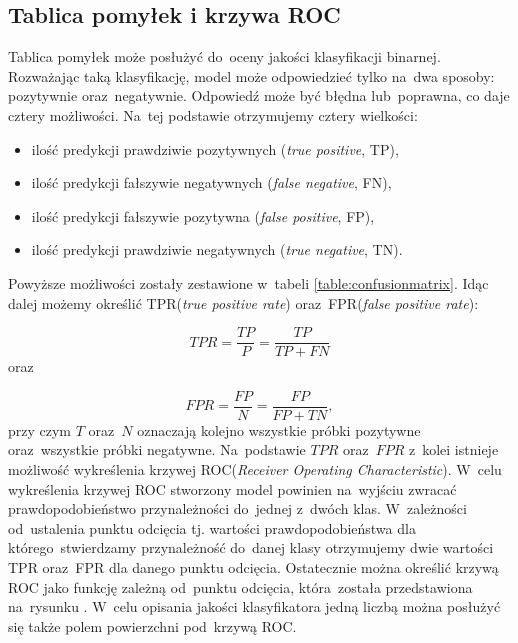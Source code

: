 \subsection{Tablica pomyłek i krzywa ROC}
Tablica pomyłek może posłużyć do~oceny jakości klasyfikacji binarnej. Rozważając taką klasyfikację, model może odpowiedzieć tylko na~dwa sposoby: pozytywnie oraz~negatywnie. Odpowiedź może być błędna lub~poprawna, co daje cztery możliwości. Na~tej podstawie otrzymujemy cztery wielkości:
\begin{itemize}
\item ilość predykcji prawdziwie pozytywnych (\textit{true positive}, TP),
\item ilość predykcji fałszywie negatywnych (\textit{false negative}, FN),
\item ilość predykcji fałszywie pozytywna (\textit{false positive}, FP),
\item ilość predykcji prawdziwie negatywnych (\textit{true negative}, TN).
\end{itemize}
Powyższe możliwości zostały zestawione w~tabeli \ref{table:confusionmatrix}. Idąc dalej możemy określić TPR(\textit{true positive rate}) oraz~FPR(\textit{false positive rate}):

\begin{equation}
TPR = \frac{TP}{P} = \frac{TP}{TP+FN} 
\end{equation}
\noindent
oraz

\begin{equation}
FPR = \frac{FP}{N} = \frac{FP}{FP+TN},
\end{equation}
przy czym $T$ oraz~$N$ oznaczają kolejno wszystkie próbki pozytywne oraz~wszystkie próbki negatywne. Na~podstawie $TPR$ oraz~$FPR$ z~kolei istnieje możliwość wykreślenia krzywej ROC(\textit{Receiver Operating Characteristic}). W~celu wykreślenia krzywej ROC stworzony model powinien na~wyjściu zwracać prawdopodobieństwo  przynależności do~jednej z~dwóch klas. W~zależności od~ustalenia punktu odcięcia tj. wartości prawdopodobieństwa dla którego~stwierdzamy przynależność do~danej klasy otrzymujemy dwie wartości TPR oraz~FPR dla danego punktu odcięcia. Ostatecznie można określić krzywą ROC jako funkcję zależną od~punktu odcięcia, która~została przedstawiona na~rysunku \label{roc}. W~celu opisania jakości klasyfikatora jedną liczbą można posłużyć się także polem powierzchni pod~krzywą ROC.

